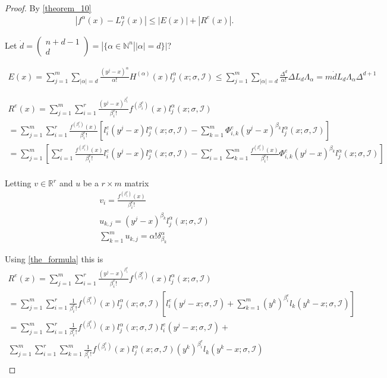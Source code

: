 \documentclass{article}
\theoremstyle{case}
\newcommand{\naturals}{\mathbb N}
\newcommand{\natsn}{\naturals^n}
\newcommand{\bidx}{{\mathcal I}}
\begin{document}
\begin{proof}
By \cref{theorem_10}
\begin{align*}
\left| f^{\alpha}(x) - L_f^{\alpha}(x) \right| \le |E(x)| + |R^e(x)|.
\end{align*}


Let $\dot d = \begin{pmatrix}n + d - 1 \\ d\end{pmatrix} = |\{\alpha \in \natsn | |\alpha| = d\}|$?

\begin{align*}
E(x) = \sum_{j=1}^m \sum_{|\alpha|=d}\frac{\left(y^j - x\right)^{\alpha}}{\alpha!} H^{(\alpha)}(x)l_j^{\alpha}(x; \sigma, \bidx)
\le \sum_{j=1}^m \sum_{|\alpha|=d}\frac{\Delta^{d}}{\alpha!} \Delta L_d \Lambda_{\alpha} = m\dot d L_d \Lambda_{\alpha} \Delta^{d+1}
\end{align*}

\begin{align*}
R^e(x) = \sum_{j=1}^m\sum_{i=1}^r \frac{\left(y^j - x\right)^{\beta^e_i}}{\beta^e_i!}f^{(\beta^e_i)}(x)l_j^{\alpha}(x; \sigma, \bidx) \\
= \sum_{j=1}^m\sum_{i=1}^r \frac{f^{(\beta^e_i)}(x)}{\beta^e_i!}\left[l^e_i(y^j- x)l_j^{\alpha}(x; \sigma, \bidx) - \sum_{k=1}^m \Phi^e_{i,k}(y^j - x)^{\beta_k}l_j^{\alpha}(x; \sigma, \bidx) \right] \\
= \sum_{j=1}^m\left[\sum_{i=1}^r \frac{f^{(\beta^e_i)}(x)}{\beta^e_i!}l^e_i(y^j- x)l_j^{\alpha}(x; \sigma, \bidx) - \sum_{i=1}^r \sum_{k=1}^m \frac{f^{(\beta^e_i)}(x)}{\beta^e_i!}\Phi^e_{i,k}(y^j - x)^{\beta_k}l_j^{\alpha}(x; \sigma, \bidx) \right] \\
\end{align*}

Letting $v \in \mathbb R^r$ and $u$ be a $r \times m$ matrix
\begin{align*}
v_i = \frac{f^{(\beta^e_i)}(x)}{\beta^e_i!}\\
u_{k,j} = (y^j - x)^{\beta_k}l_j^{\alpha}(x; \sigma, \bidx) \\
\sum_{k=1}^m u_{k,j} = \alpha!\delta^{\alpha}_{\beta_k}
\end{align*}


Using \cref{the_formula} this is
\begin{align*}
R^e(x) = \sum_{j=1}^m\sum_{i=1}^r \frac{\left(y^j - x\right)^{\beta^e_i}}{\beta^e_i!}f^{(\beta^e_i)}(x)l_j^{\alpha}(x; \sigma, \bidx) \\
= \sum_{j=1}^m\sum_{i=1}^r \frac{1}{\beta^e_i!}f^{(\beta^e_i)}(x)l_j^{\alpha}(x; \sigma, \bidx)\left[l_i^e(y^j - x; \sigma, \bidx) + \sum_{k=1}^m \left(y^k\right)^{\beta_i^e} l_k(y^k - x; \sigma, \bidx)\right] \\
= 
\sum_{j=1}^m\sum_{i=1}^r \frac{1}{\beta^e_i!}f^{(\beta^e_i)}(x)l_j^{\alpha}(x; \sigma, \bidx)l_i^e(y^j - x; \sigma, \bidx) + \\
\sum_{j=1}^m\sum_{i=1}^r \sum_{k=1}^m\frac{1}{\beta^e_i!}f^{(\beta^e_i)}(x)l_j^{\alpha}(x; \sigma, \bidx) \left(y^k\right)^{\beta_i^e} l_k(y^k - x; \sigma, \bidx) \\
\end{align*}


\end{proof}
\end{document}
